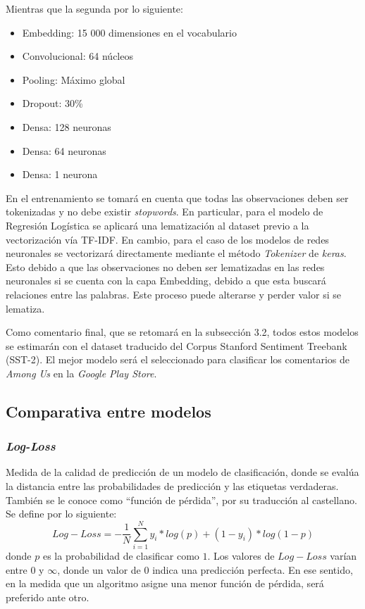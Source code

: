 Mientras que la segunda por lo siguiente:
\begin{itemize}
	\itemsep0em 
	\item Embedding: 15 000 dimensiones en el vocabulario
	\item Convolucional: 64 núcleos
	\item Pooling: Máximo global
	\item Dropout: 30\%
	\item Densa: 128 neuronas
	\item Densa: 64 neuronas
	\item Densa: 1 neurona	
\end{itemize}

En el entrenamiento se tomará en cuenta que todas las observaciones deben ser tokenizadas y no debe existir \textit{stopwords}. En particular, para el modelo de Regresión Logística se aplicará una lematización al dataset previo a la vectorización vía TF-IDF. En cambio, para el caso de los modelos de redes neuronales se vectorizará directamente mediante el método \textit{Tokenizer} de \textit{keras}. Esto debido a que las observaciones no deben ser lematizadas en las redes neuronales si se cuenta con la capa Embedding, debido a que esta buscará relaciones entre las palabras. Este proceso puede alterarse y perder valor si se lematiza.

Como comentario final, que se retomará en la subsección 3.2, todos estos modelos se estimarán con el dataset traducido del Corpus Stanford Sentiment Treebank (SST-2). El mejor modelo será el seleccionado para clasificar los comentarios de \textit{Among Us} en la \textit{Google Play Store}.


\subsection{Comparativa entre modelos}
\subsubsection{\textit{Log-Loss}}
Medida de la calidad de predicción de un modelo de clasificación, donde se evalúa la distancia entre las probabilidades de predicción y las etiquetas verdaderas. También se le conoce como “función de pérdida”, por su traducción al castellano. Se define por lo siguiente:
\begin{equation}
	Log-Loss = - \dfrac{1}{N} \sum_{i=1}^{N} y_i * log(p) + (1-y_i) * log (1-p)
\end{equation}
donde $p$ es la probabilidad de clasificar como $1$. Los valores de $Log-Loss$ varían entre 0 y $\infty$, donde un valor de 0 indica una predicción perfecta. En ese sentido, en la medida que un algoritmo asigne una menor función de pérdida, será preferido ante otro.

